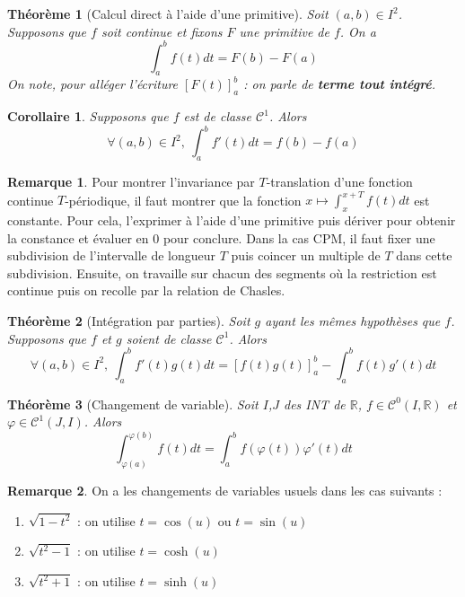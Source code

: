 \documentclass[french]{book}
\newcommand{\R}{\mathbb{R}}
\theoremstyle{plain}
\newtheorem{thm}{Théorème}[chapter]
\newtheorem{cor}{Corollaire}[chapter]
\theoremstyle{definition}
\newtheorem{rmq}{Remarque}[chapter]
\theoremstyle{remark}
\begin{document}
\begin{thm}[Calcul direct à l'aide d'une primitive]
	Soit $(a,b)\in I^2$. Supposons que $f$ soit continue et fixons $F$ une primitive de $f$. On a $$\int_{a}^{b}f(t)dt=F(b)-F(a)$$ On note, pour alléger l'écriture $[F(t)]_a^b$ : on parle de \textbf{terme tout intégré}.
\end{thm}
\begin{cor}
	Supposons que $f$ est de classe $\mathcal{C}^1$. Alors $$\forall (a,b)\in I^2, \ \int_{a}^{b}f'(t)dt=f(b)-f(a)$$
\end{cor}
\begin{rmq} Pour montrer l'invariance par $T$-translation d'une fonction continue $T$-périodique, il faut montrer que la fonction $x\mapsto\int_{x}^{x+T}f(t)dt$ est constante. Pour cela, l'exprimer à l'aide d'une primitive puis dériver pour obtenir la constance et évaluer en 0 pour conclure. Dans la cas CPM, il faut fixer une subdivision de l'intervalle de longueur $T$ puis coincer un multiple de $T$ dans cette subdivision. Ensuite, on travaille sur chacun des segments où la restriction est continue puis on recolle par la relation de Chasles. \end{rmq}
\begin{thm}[Intégration par parties]
	Soit $g$ ayant les mêmes hypothèses que $f$. Supposons que $f$ et $g$ soient de classe $\mathcal{C}^1$. Alors 
	$$\forall (a,b)\in I^2, \ \int_{a}^{b}f'(t)g(t)dt=[f(t)g(t)]_a^b-\int_{a}^{b}f(t)g'(t)dt$$
\end{thm}
\begin{thm}[Changement de variable]
	Soit $I$,$J$ des INT de $\R$, $f\in\mathcal{C}^0(I,\R)$ et $\varphi\in\mathcal{C}^1(J,I)$. Alors 
	$$\int_{\varphi(a)}^{\varphi(b)}f(t)dt=\int_{a}^{b}f(\varphi(t))\varphi'(t)dt$$
\end{thm}
\begin{rmq} On a les changements de variables usuels dans les cas suivants :
	\begin{enumerate}
		\item $\sqrt{1-t^2}$ : on utilise $t=\cos(u)$ ou $t=\sin(u)$
		\item $\sqrt{t^2-1}$ : on utilise $t=\cosh(u)$
		\item $\sqrt{t^2+1}$ : on utilise $t=\sinh(u)$
\end{enumerate} \end{rmq}
\end{document}
